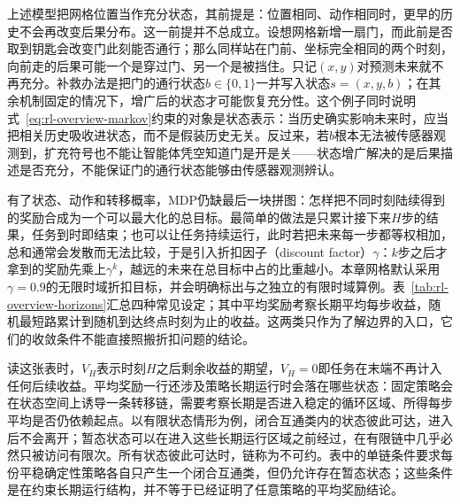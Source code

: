 上述模型把网格位置当作充分状态，其前提是：位置相同、动作相同时，更早的历史不会再改变后果分布。这一前提并不总成立。设想网格新增一扇门，而此前是否取到钥匙会改变门此刻能否通行；那么同样站在门前、坐标完全相同的两个时刻，向前走的后果可能一个是穿过门、另一个是被挡住。只记$(x,y)$对预测未来就不再充分。补救办法是把门的通行状态$b\in\{0,1\}$一并写入状态$s=(x,y,b)$；在其余机制固定的情况下，增广后的状态才可能恢复充分性。这个例子同时说明式~\eqref{eq:rl-overview-markov}约束的对象是状态表示：当历史确实影响未来时，应当把相关历史吸收进状态，而不是假装历史无关。反过来，若$b$根本无法被传感器观测到，扩充符号也不能让智能体凭空知道门是开是关——状态增广解决的是后果描述是否充分，不能保证门的通行状态能够由传感器观测辨认。

有了状态、动作和转移概率，MDP仍缺最后一块拼图：怎样把不同时刻陆续得到的奖励合成为一个可以最大化的总目标。最简单的做法是只累计接下来$H$步的结果，任务到时即结束；也可以让任务持续运行，此时若把未来每一步都等权相加，总和通常会发散而无法比较，于是引入折扣因子（discount factor）$\gamma$：$k$步之后才拿到的奖励先乘上$\gamma^k$，越远的未来在总目标中占的比重越小。本章网格默认采用$\gamma=0.9$的无限时域折扣目标，并会明确标出与之独立的有限时域算例。表~\ref{tab:rl-overview-horizons}汇总四种常见设定；其中平均奖励考察长期平均每步收益，随机最短路累计到随机到达终点时刻为止的收益。这两类只作为了解边界的入口，它们的收敛条件不能直接照搬折扣问题的结论。

读这张表时，$V_H$表示时刻$H$之后剩余收益的期望，$V_H=0$即任务在末端不再计入任何后续收益。平均奖励一行还涉及策略长期运行时会落在哪些状态：固定策略会在状态空间上诱导一条转移链，需要考察长期是否进入稳定的循环区域、所得每步平均是否仍依赖起点。以有限状态情形为例，闭合互通类内的状态彼此可达，进入后不会离开；暂态状态可以在进入这些长期运行区域之前经过，在有限链中几乎必然只被访问有限次。所有状态彼此可达时，链称为不可约。表中的单链条件要求每份平稳确定性策略各自只产生一个闭合互通类，但仍允许存在暂态状态；这些条件是在约束长期运行结构，并不等于已经证明了任意策略的平均奖励结论。


